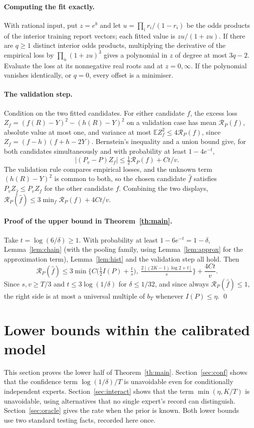 \documentclass[11pt,a4paper]{article}
\theoremstyle{remark}
\newcommand{\E}{\mathbb E}
\newcommand{\cR}{\mathcal R}
\begin{document}
\paragraph{Computing the fit exactly.} With rational input, put $z=e^b$ and let $u=\prod_i r_i/(1-r_i)$ be the odds products of the interior training report vectors; each fitted value is $zu/(1+zu)$. If there are $q\ge1$ distinct interior odds products, multiplying the derivative of the empirical loss by $\prod_u(1+zu)^3$ gives a polynomial in $z$ of degree at most $3q-2$. Evaluate the loss at its nonnegative real roots and at $z=0,\infty$. If the polynomial vanishes identically, or $q=0$, every offset is a minimiser.

\paragraph{The validation step.} Condition on the two fitted candidates. For either candidate $f$, the excess loss $Z_f=(f(R)-Y)^2-(h(R)-Y)^2$ on a validation case has mean $\cR_P(f)$, absolute value at most one, and variance at most $\E Z_f^2\le4\cR_P(f)$, since $Z_f=(f-h)(f+h-2Y)$. Bernstein's inequality and a union bound give, for both candidates simultaneously and with probability at least $1-4e^{-t}$,
\[
 |(P_v-P)Z_f|\le \tfrac12\cR_P(f)+C t/v .
\]
The validation rule compares empirical losses, and the unknown term $(h(R)-Y)^2$ is common to both, so the chosen candidate $\widehat f$ satisfies $P_vZ_{\widehat f}\le P_vZ_{f}$ for the other candidate $f$. Combining the two displays, $\cR_P(\widehat f)\le3\min_f\cR_P(f)+4Ct/v$.

\paragraph{Proof of the upper bound in Theorem~\ref{th:main}.} Take $t=\log(6/\delta)\ge1$. With probability at least $1-6e^{-t}=1-\delta$, Lemma~\ref{lem:chain} (with the pooling family, using Lemma~\ref{lem:approx} for the approximation term), Lemma~\ref{lem:hist} and the validation step all hold. Then
\[
 \cR_P(\widehat f)\le 3\min\Big\{C\big(\tfrac12 I(P)+\tfrac{t}{s}\big),\ \tfrac{2[(2K-1)\log2+t]}{s}\Big\}+\frac{4Ct}{v}.
\]
Since $s,v\ge T/3$ and $t\le 3\log(1/\delta)$ for $\delta\le1/32$, and since always $\cR_P(\widehat f)\le1$, the right side is at most a universal multiple of $b_T$ whenever $I(P)\le\eta$. \qed

\section{Lower bounds within the calibrated model}\label{sec:lower}
This section proves the lower half of Theorem~\ref{th:main}. Section~\ref{sec:conf} shows that the confidence term $\log(1/\delta)/T$ is unavoidable even for conditionally independent experts. Section~\ref{sec:interact} shows that the term $\min(\eta,K/T)$ is unavoidable, using alternatives that no single expert's record can distinguish. Section~\ref{sec:oracle} gives the rate when the prior is known. Both lower bounds use two standard testing facts, recorded here once.
\end{document}
